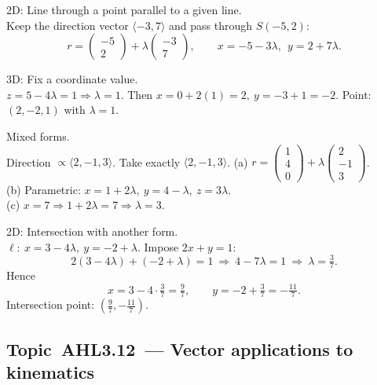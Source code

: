 \documentclass[11pt]{article}
\def\textbf#1{#1}%
\def\mathbf#1{#1}%
\newcommand{\tocsubsection}[1]{\subsection{#1}}
\begin{document}
\begin{solution}
\textbf{2D: Line through a point parallel to a given line.}\\
Keep the direction vector \(\langle-3,7\rangle\) and pass through \(S(-5,2)\):  
\[
\mathbf{r}=\begin{pmatrix}-5\\2\end{pmatrix}+\lambda\begin{pmatrix}-3\\7\end{pmatrix},\qquad
x=-5-3\lambda,\ \ y=2+7\lambda.
\]
\end{solution}

\begin{solution}
\textbf{3D: Fix a coordinate value.}\\
\(z=5-4\lambda=1\Rightarrow \lambda=1\).  
Then \(x=0+2(1)=2,\ y=-3+1=-2\).  
Point: \((2,-2,1)\) with \(\lambda=1\).
\end{solution}

\begin{solution}
\textbf{Mixed forms.}\\
Direction \(\propto\langle2,-1,3\rangle\). Take exactly \(\langle2,-1,3\rangle\).  
(a) \(\displaystyle \mathbf{r}=\begin{pmatrix}1\\4\\0\end{pmatrix}+\lambda\begin{pmatrix}2\\-1\\3\end{pmatrix}\).\\
(b) Parametric: \(x=1+2\lambda,\ y=4-\lambda,\ z=3\lambda\).\\
(c) \(x=7\Rightarrow 1+2\lambda=7\Rightarrow \lambda=3\).
\end{solution}

\begin{solution}
\textbf{2D: Intersection with another form.}\\
\(\ell:\ x=3-4\lambda,\ y=-2+\lambda\).  
Impose \(2x+y=1\):
\[
2(3-4\lambda)+(-2+\lambda)=1
\ \Rightarrow\ 4-7\lambda=1
\ \Rightarrow\ \lambda=\tfrac{3}{7}.
\]
Hence
\[
x=3-4\cdot\tfrac{3}{7}=\tfrac{9}{7},\qquad
y=-2+\tfrac{3}{7}=-\tfrac{11}{7}.
\]
Intersection point: \(\left(\tfrac{9}{7},-\tfrac{11}{7}\right)\).
\end{solution}


\tocsubsection{Topic AHL3.12 — Vector applications to kinematics}
\end{document}
